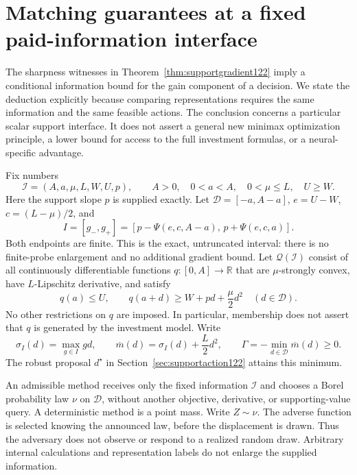 \section{Matching guarantees at a fixed paid-information interface}
\label{supp:informationminimax122}

The sharpness witnesses in Theorem~\ref{thm:supportgradient122} imply a
conditional information bound for the gain component of a decision. We state
the deduction explicitly because comparing representations requires the same
information and the same feasible actions. The conclusion concerns a
particular scalar support interface. It does not assert a general new
minimax optimization principle, a lower bound for access to the full
investment formulas, or a neural-specific advantage.

Fix numbers
\[
 \mathcal I=(A,a,\mu,L,W,U,p),\qquad
 A>0,\quad 0<a<A,\quad 0<\mu\le L,\quad U\ge W.
\]
Here the support slope $p$ is supplied exactly. Let
$\mathcal D=[-a,A-a]$, $e=U-W$, $c=(L-\mu)/2$, and
\[
 I=[g_-,g_+]
   =[p-\Psi(e,c,A-a),\,p+\Psi(e,c,a)].
\]
Both endpoints are finite. This is the exact, untruncated interval:
there is no finite-probe enlargement and no additional gradient bound.
Let $\mathcal Q(\mathcal I)$ consist of all continuously differentiable
functions $q:[0,A]\to\mathbb R$ that are $\mu$-strongly convex, have
$L$-Lipschitz derivative, and satisfy
\[
 q(a)\le U,\qquad
 q(a+d)\ge W+pd+\frac{\mu}{2}d^2
 \quad(d\in\mathcal D).
\]
No other restrictions on $q$ are imposed. In particular, membership does
not assert that $q$ is generated by the investment model. Write
\[
 \sigma_I(d)=\max_{g\in I}gd,\qquad
 \overline m(d)=\sigma_I(d)+\frac L2d^2,\qquad
 \Gamma=-\min_{d\in\mathcal D}\overline m(d)\ge0.
\]
The robust proposal $d^\star$ in
Section~\ref{sec:supportaction122} attains this minimum.

An admissible method receives only the fixed information $\mathcal I$ and
chooses a Borel probability law $\nu$ on $\mathcal D$, without another
objective, derivative, or supporting-value query. A deterministic method
is a point mass. Write $Z\sim\nu$. The adverse function is selected knowing
the announced law, before the displacement is drawn. Thus the adversary
does not observe or respond to a realized random draw. Arbitrary internal
calculations and representation labels do not enlarge the supplied
information.

